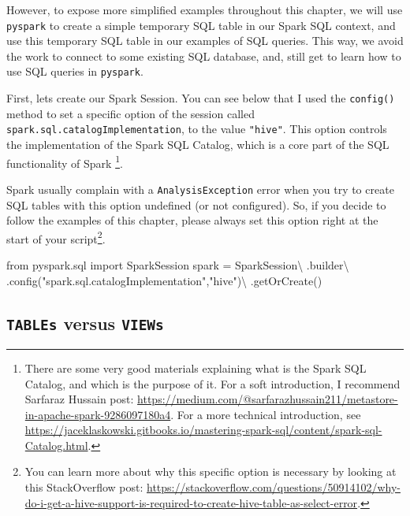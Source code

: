 \documentclass[
  11pt,
  letterpaper,
  DIV=11,
  numbers=noendperiod]{scrreprt}
\newenvironment{Shaded}{\begin{snugshade}}{\end{snugshade}}
\newcommand{\ImportTok}[1]{\textcolor[rgb]{0.00,0.46,0.62}{#1}}
\newcommand{\NormalTok}[1]{\textcolor[rgb]{0.00,0.23,0.31}{#1}}
\newcommand{\OperatorTok}[1]{\textcolor[rgb]{0.37,0.37,0.37}{#1}}
\newcommand{\StringTok}[1]{\textcolor[rgb]{0.13,0.47,0.30}{#1}}
\begin{document}
However, to expose more simplified examples throughout this chapter, we
will use \texttt{pyspark} to create a simple temporary SQL table in our
Spark SQL context, and use this temporary SQL table in our examples of
SQL queries. This way, we avoid the work to connect to some existing SQL
database, and, still get to learn how to use SQL queries in
\texttt{pyspark}.

First, lets create our Spark Session. You can see below that I used the
\texttt{config()} method to set a specific option of the session called
\texttt{spark.sql.catalogImplementation}, to the value \texttt{"hive"}.
This option controls the implementation of the Spark SQL Catalog, which
is a core part of the SQL functionality of Spark \footnote{There are
  some very good materials explaining what is the Spark SQL Catalog, and
  which is the purpose of it. For a soft introduction, I recommend
  Sarfaraz Hussain post:
  \url{https://medium.com/@sarfarazhussain211/metastore-in-apache-spark-9286097180a4}.
  For a more technical introduction, see
  \url{https://jaceklaskowski.gitbooks.io/mastering-spark-sql/content/spark-sql-Catalog.html}.}.

Spark usually complain with a \texttt{AnalysisException} error when you
try to create SQL tables with this option undefined (or not configured).
So, if you decide to follow the examples of this chapter, please always
set this option right at the start of your script\footnote{You can learn
  more about why this specific option is necessary by looking at this
  StackOverflow post:
  \url{https://stackoverflow.com/questions/50914102/why-do-i-get-a-hive-support-is-required-to-create-hive-table-as-select-error}.}.

\begin{Shaded}
\begin{Highlighting}[]
\ImportTok{from}\NormalTok{ pyspark.sql }\ImportTok{import}\NormalTok{ SparkSession}
\NormalTok{spark }\OperatorTok{=}\NormalTok{ SparkSession}\OperatorTok{\textbackslash{}}
\NormalTok{  .builder}\OperatorTok{\textbackslash{}}
\NormalTok{  .config(}\StringTok{"spark.sql.catalogImplementation"}\NormalTok{,}\StringTok{"hive"}\NormalTok{)}\OperatorTok{\textbackslash{}}
\NormalTok{  .getOrCreate()}
\end{Highlighting}
\end{Shaded}

\hypertarget{tables-versus-views}{%
\subsection{\texorpdfstring{\texttt{TABLEs} versus
\texttt{VIEWs}}{TABLEs versus VIEWs}}\label{tables-versus-views}}
\end{document}
